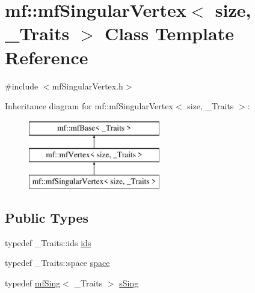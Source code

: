 \hypertarget{classmf_1_1mfSingularVertex}{
\section{mf::mfSingularVertex$<$ size, \_\-Traits $>$ Class Template Reference}
\label{classmf_1_1mfSingularVertex}
}


{\ttfamily \#include $<$mfSingularVertex.h$>$}

Inheritance diagram for mf::mfSingularVertex$<$ size, \_\-Traits $>$:\begin{figure}[H]
\begin{center}
\leavevmode
\includegraphics[height=3.000000cm]{classmf_1_1mfSingularVertex}
\end{center}
\end{figure}
\subsection*{Public Types}
\begin{DoxyCompactItemize}
\item 
typedef \_\-Traits::ids \hyperlink{classmf_1_1mfSingularVertex_ad951601375961980e2ad033de57e14a1}{ids}
\item 
typedef \_\-Traits::space \hyperlink{classmf_1_1mfSingularVertex_a96d4909dd62a8e8889eda76d0148db2a}{space}
\item 
typedef \hyperlink{classmf_1_1mfSing}{mfSing}$<$ \_\-Traits $>$ \hyperlink{classmf_1_1mfSingularVertex_ac992cd55c8554406174a3a1449af209b}{sSing}
\end{DoxyCompactItemize}
